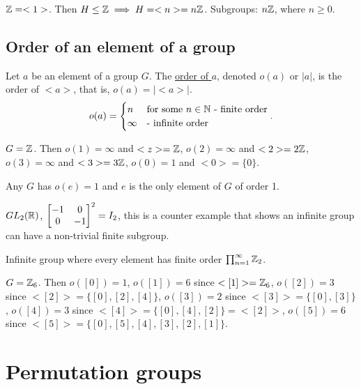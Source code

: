 \documentclass[]{article}
\begin{document}
\begin{example}
	$\mathbb{Z} = <1>$. Then $H\leq \mathbb{Z} \implies H = <n> = n\mathbb{Z}$. Subgroups: $n\mathbb{Z}$, where $n\geq 0$.
\end{example}

\subsection{Order of an element of a group}
\begin{definition}
	Let $a$ be an element of a group $G$. The \ul{order of $a$}, denoted $o(a)$ or $|a|$, is the order of $<a>$, that is, $o(a) = |<a>|$.
	$$o(a) = \begin{cases} n & \text{for some } n\in\mathbb{N} \text{ - finite order} \\ \infty & \text{- infinite order} \end{cases}. $$
\end{definition}
\begin{example}
	$G = \mathbb{Z}$. Then $o(1) = \infty$ and $<z> = \mathbb{Z}$, $o(2) = \infty$ and $<2> = 2\mathbb{Z}$, $o(3) = \infty$ and $<3> = 3\mathbb{Z}$, $o(0) = 1$ and $<0> = \{0\}$.
\end{example}
\begin{note}
	Any $G$ has $o(e) = 1$ and $e$ is the only element of $G$ of order 1.
\end{note}
\begin{example}
	$GL_2(\mathbb{R})$, $\begin{bmatrix}-1&0 \\0&-1\end{bmatrix}^2 = I_2$, this is a counter example that shows an infinite group can have a non-trivial finite subgroup.
\end{example}
\begin{example}
	Infinite group where every element has finite order $\prod_{n=1}^\infty \mathbb{Z}_2$.
\end{example}
\begin{example}
	$G = \mathbb{Z}_6$. Then $o([0]) = 1$, $o([1]) = 6$ since $<[1]> = \mathbb{Z}_6$, $o([2]) = 3$ since $<[2]> = \{[0],[2],[4]\}$, $o([3]) = 2$ since $<[3]> = \{[0],[3]\}$, $o([4]) = 3$ since $<[4]> = \{[0],[4],[2]\} = <[2]>$, $o([5]) = 6$ since $<[5]> = \{[0],[5],[4],[3],[2],[1]\}$.
\end{example}

\section{Permutation groups}
\end{document}
